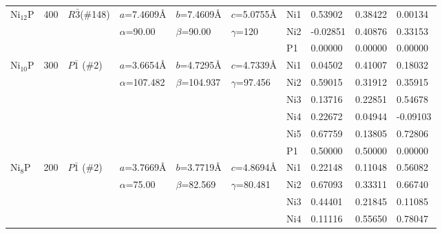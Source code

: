 \documentclass[twoside,twocolumn,9pt]{article}
\begin{document}
\begin{table}[t]
\begin{tabular*}{\textwidth}{@{\extracolsep{\fill}}llllllllll}
\midrule
    Ni$_{12}$P & 400 & $R\bar3$(\#148)    & $a$=7.4609\AA    & $b$=7.4609\AA   & $c$=5.0755\AA    & Ni1 & 0.53902  & 0.38422 & 0.00134 \\
               &     &               & $\alpha$=90.00   & $\beta$=90.00 & $\gamma$=120       & Ni2 & -0.02851 & 0.40876 & 0.33153 \\
               &     &               &                  &                 &                  & P1  & 0.00000  & 0.00000 & 0.00000 \\
\midrule
    Ni$_{10}$P & 300 & $P\bar{1}$ (\#2)     & $a$=3.6654\AA    & $b$=4.7295\AA   & $c$=4.7339\AA    & Ni1 & 0.04502 & 0.41007 & 0.18032 \\
               &     &               & $\alpha$=107.482 & $\beta$=104.937 & $\gamma$=97.456  & Ni2 & 0.59015 & 0.31912 & 0.35915 \\
               &     &               &                  &                 &                  & Ni3 & 0.13716 & 0.22851 & 0.54678 \\
               &     &               &                  &                 &                  & Ni4 & 0.22672 & 0.04944 & -0.09103\\
               &     &               &                  &                 &                  & Ni5 & 0.67759 & 0.13805 & 0.72806 \\
               &     &               &                  &                 &                  & P1  & 0.50000 & 0.50000 & 0.00000 \\
\midrule
    Ni$_{8}$P  & 200 & $P\bar{1}$ (\#2)     & $a$=3.7669\AA    & $b$=3.7719\AA   & $c$=4.8694\AA    & Ni1 & 0.22148 & 0.11048 & 0.56082 \\
               &     &               & $\alpha$=75.00 & $\beta$=82.569 & $\gamma$=80.481     & Ni2 & 0.67093 & 0.33311 & 0.66740 \\
               &     &               &                  &                 &                  & Ni3 & 0.44401 & 0.21845 & 0.11085 \\
               &     &               &                  &                 &                  & Ni4 & 0.11116 & 0.55650 & 0.78047 \\

\end{tabular*}
\end{table}
\end{document}

